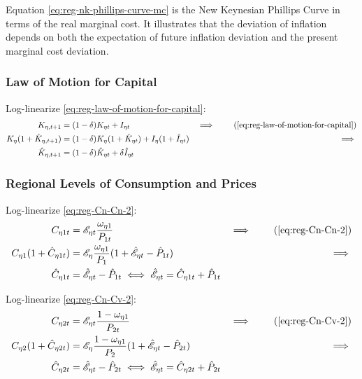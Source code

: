 \documentclass[
thesis.tex
]{subfiles}
\begin{document}
Equation \ref{eq:reg-nk-phillips-curve-mc} is the New Keynesian Phillips Curve in terms of the real marginal cost. It illustrates that the deviation of inflation depends on both the expectation of future inflation deviation and the present marginal cost deviation.


\subsubsection*{Law of Motion for Capital}

Log-linearize \ref{eq:reg-law-of-motion-for-capital}:
	\begin{alignat}{2}
		K_{\eta, t+1} &= (1-\delta)K_{\eta t} + I_{\eta t} &\implies \tag{\ref{eq:reg-law-of-motion-for-capital}} \\
		K_{\eta} (1 + \hat{K}_{\eta, t+1}) &= (1-\delta) K_{\eta} (1 + \hat{K}_{\eta t}) + I_{\eta} (1 + \hat{I}_{\eta t}) &\implies \nonumber \\
		\hat{K}_{\eta, t+1} &= (1-\delta) \hat{K}_{\eta t} + \delta \hat{I}_{\eta t} \label{eq:reg-ll-law-of-motion-for-capital}
	\end{alignat}


\subsubsection*{Regional Levels of Consumption and Prices}

Log-linearize \ref{eq:reg-Cn-Cn-2}:
\begin{alignat}{2}
	C_{\eta 1 t} &= \te \frac{\omega_{\eta 1}}{P_{1 t}} &\implies \tag{\ref{eq:reg-Cn-Cn-2}} \\
	C_{\eta 1} (1 + \hat{C}_{\eta 1 t}) &= \mathscr{E}_{\eta} \frac{\omega_{\eta 1}}{P_{1}} (1 + \hat{\mathscr{E}}_{\eta t} - \hat{P}_{1 t}) &\implies \nonumber \\
	\hat{C}_{\eta 1 t} &= \hat{\mathscr{E}}_{\eta t} - \hat{P}_{1 t} \iff \hat{\mathscr{E}}_{\eta t} = \hat{C}_{\eta 1 t} + \hat{P}_{1 t} \label{eq:reg-ll-Cn-Cn-2}
\end{alignat}


Log-linearize \ref{eq:reg-Cn-Cv-2}:
\begin{alignat}{2}
	C_{\eta 2 t} &= \te \frac{1 - \omega_{\eta 1}}{P_{2 t}} &\implies \tag{\ref{eq:reg-Cn-Cv-2}} \\
	C_{\eta 2} (1 + \hat{C}_{\eta 2 t}) &= \mathscr{E}_{\eta} \frac{1 - \omega_{\eta 1}}{P_{2}} (1 + \hat{\mathscr{E}}_{\eta t} - \hat{P}_{2 t}) &\implies \nonumber \\
	\hat{C}_{\eta 2 t} &= \hat{\mathscr{E}}_{\eta t} - \hat{P}_{2 t} \iff \hat{\mathscr{E}}_{\eta t} = \hat{C}_{\eta 2 t} + \hat{P}_{2 t} \label{eq:reg-ll-Cn-Cv-2}
\end{alignat}
\end{document}

